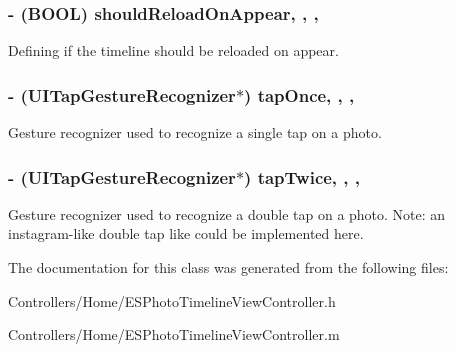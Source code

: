 \subsubsection[{should\+Reload\+On\+Appear}]{\setlength{\rightskip}{0pt plus 5cm}-\/ (B\+O\+O\+L) should\+Reload\+On\+Appear\hspace{0.3cm}{\ttfamily [read]}, {\ttfamily [write]}, {\ttfamily [nonatomic]}, {\ttfamily [assign]}}\label{interface_e_s_photo_timeline_view_controller_a9b1ebe8df6266603edf00e80b2e1fd0c}
Defining if the timeline should be reloaded on appear. \hypertarget{interface_e_s_photo_timeline_view_controller_a10c056efa7e26d8f4275aa67d6fc9b0b}{}
\subsubsection[{tap\+Once}]{\setlength{\rightskip}{0pt plus 5cm}-\/ (U\+I\+Tap\+Gesture\+Recognizer$\ast$) tap\+Once\hspace{0.3cm}{\ttfamily [read]}, {\ttfamily [write]}, {\ttfamily [nonatomic]}, {\ttfamily [strong]}}\label{interface_e_s_photo_timeline_view_controller_a10c056efa7e26d8f4275aa67d6fc9b0b}
Gesture recognizer used to recognize a single tap on a photo. \hypertarget{interface_e_s_photo_timeline_view_controller_a173f7f4c7ded326bc033ca82fb5bd98c}{}
\subsubsection[{tap\+Twice}]{\setlength{\rightskip}{0pt plus 5cm}-\/ (U\+I\+Tap\+Gesture\+Recognizer$\ast$) tap\+Twice\hspace{0.3cm}{\ttfamily [read]}, {\ttfamily [write]}, {\ttfamily [nonatomic]}, {\ttfamily [strong]}}\label{interface_e_s_photo_timeline_view_controller_a173f7f4c7ded326bc033ca82fb5bd98c}
Gesture recognizer used to recognize a double tap on a photo. Note\+: an instagram-\/like double tap like could be implemented here. 

The documentation for this class was generated from the following files\+:\begin{DoxyCompactItemize}
\item 
Controllers/\+Home/E\+S\+Photo\+Timeline\+View\+Controller.\+h\item 
Controllers/\+Home/E\+S\+Photo\+Timeline\+View\+Controller.\+m\end{DoxyCompactItemize}
